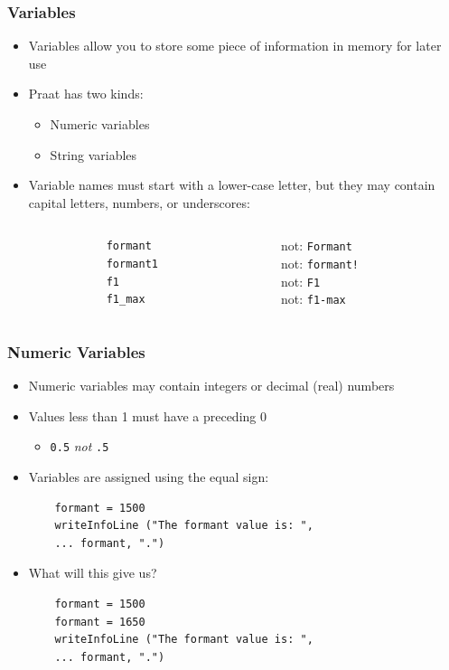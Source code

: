 \documentclass[handout]{beamer}
\begin{document}
\begin{frame}[fragile]
\frametitle{Variables}
\begin{itemize}
    \item <1-> Variables allow you to store some piece of information in memory for later use
    \item <2-> Praat has two kinds:
    \begin{itemize}
        \item Numeric variables
        \item String variables
    \end{itemize}
    \item<3-> Variable names must start with a lower-case letter, but they may contain capital letters, numbers, or underscores:
    \begin{columns}[]
        \begin{column}{0.5\textwidth}
            \begin{verbatim}
            formant
            formant1
            f1
            f1_max
            \end{verbatim}
        \end{column}

        \begin{column}{0.5\textwidth}
            not: \texttt{Formant}\\
            not: \texttt{formant!}\\
            not: \texttt{F1}\\
            not: \texttt{f1-max}
        \end{column}
    \end{columns}
\end{itemize}
\end{frame}

\begin{frame}[fragile]
\frametitle{Numeric Variables}
\begin{itemize}
    \item <1-> Numeric variables may contain integers or decimal (real) numbers
    \item <1-> Values less than 1 must have a preceding 0
    \begin{itemize}
        \item \texttt{0.5} \emph{not} \texttt{.5}
    \end{itemize}
    \item <1-> Variables are assigned using the equal sign:
    \begin{verbatim}
    formant = 1500
    writeInfoLine ("The formant value is: ",
    ... formant, ".")
    \end{verbatim}

    \item <2-> What will this give us?
    \begin{verbatim}
    formant = 1500
    formant = 1650
    writeInfoLine ("The formant value is: ",
    ... formant, ".")
    \end{verbatim}
\end{itemize}
\end{frame}
\end{document}
